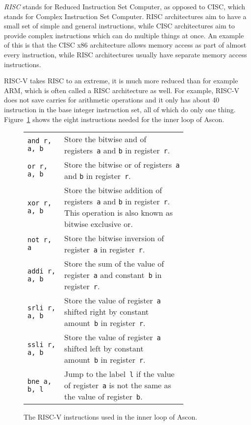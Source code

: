 \emph{RISC} stands for Reduced Instruction Set Computer, as opposed to CISC,
which stands for Complex Instruction Set Computer. RISC architectures aim to
have a small set of simple and general instructions, while CISC architectures
aim to provide complex instructions which can do multiple things at once. An
example of this is that the CISC x86 architecture allows memory access as part
of almost every instruction, while RISC architectures usually have separate
memory access instructions.

RISC-V takes RISC to an extreme, it is much more reduced than for example ARM,
which is often called a RISC architecture as well. For example, RISC-V does not
save carries for arithmetic operations and it only has about 40 instruction in
the base integer instruction set, all of which do only one thing.
Figure~\ref{opcodes} shows the eight instructions needed for the inner loop of
Ascon.


\begin{figure}
\begin{tabular}{l p{0.77\linewidth}}
       \texttt{and r, a, b} & Store the bitwise and of registers~\texttt{a} and
        \texttt{b} in register~\texttt{r}.
    \\ \texttt{or r, a, b} & Store the bitwise or of registers~\texttt{a} and
        \texttt{b} in register~\texttt{r}.
    \\ \texttt{xor r, a, b} & Store the bitwise addition of registers~\texttt{a}
        and \texttt{b} in register~\texttt{r}. This operation is also known as
        bitwise exclusive or.
    \\ \texttt{not r, a} & Store the bitwise inversion of register~\texttt{a} in
        register~\texttt{r}.
    \\ \texttt{addi r, a, b} & Store the sum of the value of register~\texttt{a}
        and constant~\texttt{b} in register~\texttt{r}.
    \\ \texttt{srli r, a, b} & Store the value of register~\texttt{a} shifted
        right by constant amount~\texttt{b} in register~\texttt{r}.
    \\ \texttt{ssli r, a, b} & Store the value of register~\texttt{a} shifted
        left by constant amount~\texttt{b} in register~\texttt{r}.
    \\ \texttt{bne a, b, l} & Jump to the label~\texttt{l} if the value of
        register~\texttt{a} is not the same as the value of register~\texttt{b}.
\end{tabular}

\caption{The RISC-V instructions used in the inner loop of Ascon.}

\label{opcodes}
\end{figure}
